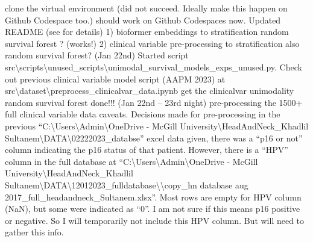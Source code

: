 \documentclass{article}%
\begin{document}
%
clone the virtual environment (did not succeed. Ideally make this happen on Github Codespace too.) %
\newline%
\newline%
%
should work on Github Codespaces now. Updated README (see for details) %
\newline%
\newline%
%
1) bioformer embeddings to stratification random survival forest ? (works!) %
\newline%
\newline%
%
2) clinical variable pre{-}processing to stratification also random survival forest? (Jan 22nd) %
\newline%
\newline%
%
Started script src\textbackslash{}scripts\textbackslash{}unused\_scripts\textbackslash{}unimodal\_survival\_models\_exps\_unused.py.   %
\newline%
\newline%
%
Check out previous clinical variable model script (AAPM 2023) at src\textbackslash{}dataset\textbackslash{}preprocess\_clinicalvar\_data.ipynb %
\newline%
\newline%
%
get the clinicalvar unimodality random survival forest done!!! (Jan 22nd – 23rd night)%
\newline%
\newline%
%
pre{-}processing the 1500+ full clinical variable data caveats. Decisions made for pre{-}processing %
\newline%
\newline%
%
in the previous “C:\textbackslash{}Users\textbackslash{}Admin\textbackslash{}OneDrive {-} McGill University\textbackslash{}HeadAndNeck\_Khadlil Sultanem\textbackslash{}DATA\textbackslash{}02222023\_databse”  excel data given, there was a “p16 or not” column indicating the p16 status of that patient. However, there is a “HPV” column in the full database at “C:\textbackslash{}Users\textbackslash{}Admin\textbackslash{}OneDrive {-} McGill University\textbackslash{}HeadAndNeck\_Khadlil Sultanem\textbackslash{}DATA\textbackslash{}12012023\_fulldatabase\textbackslash{}\textbackslash{}copy\_hn database aug 2017\_full\_headandneck\_Sultanem.xlsx”. Most rows are empty for HPV column (NaN), but some were indicated as “0”. I am not sure if this means p16 positive or negative. So I will temporarily not include this HPV column. But will need to gather this info. %
\newline%
\newline%
\end{document}

